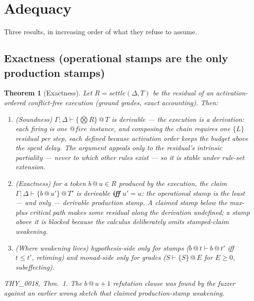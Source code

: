 \documentclass[11pt]{article}
\makeatletter
\newcommand{\lax}[2]{\{#1\}\mathbin{@}#2}       %
\newcommand{\stmp}[2]{#1\mathbin{@}#2}           %
\newcommand{\settle}{\mathit{settle}}
\newtheorem{theorem}{Theorem}[section]
\theoremstyle{definition}
\theoremstyle{remark}
\makeatother
\begin{document}
\section{Adequacy}
\label{sec:adequacy}

Three results, in increasing order of what they refuse to assume.

\subsection{Exactness (operational stamps are the only production stamps)}
\label{subsec:exact}

\begin{theorem}[Exactness]
\label{thm:exact}
Let $R = \settle(\Delta, T)$ be the residual of an activation-ordered
conflict-free execution (ground grades, exact accounting).  Then:
\begin{enumerate}
\item \emph{(Soundness)} $\Gamma; \Delta \vdash \lax{\bigotimes R}{T}$ is
  derivable --- the execution \emph{is} a derivation: each firing is one
  $\mathit{@fire}$ instance, and composing the chain requires one
  $\mathit{\{L\}}$ residual per step, each \emph{defined} because activation
  order keeps the budget above the spent delay.  The argument appeals only to
  the residual's intrinsic partiality --- never to which other rules exist ---
  so it is stable under rule-set extension.
\item \emph{(Exactness)} for a token $\stmp{b}{u} \in R$ produced by the
  execution, the claim $\Gamma; \Delta \vdash \lax{\stmp{b}{u'}}{T'}$ is derivable
  \textbf{iff} $u' = u$: the operational stamp is the least --- and \emph{only}
  --- derivable production stamp.  A claimed stamp below the max-plus critical
  path makes some residual along the derivation undefined; a stamp above it is
  blocked because the calculus deliberately omits stamped-claim weakening.
\item \emph{(Where weakening lives)} hypothesis-side only for stamps
  ($\stmp{b}{t} \vdash \stmp{b}{t'}$ iff $t \leq t'$, retiming) and monad-side
  only for grades ($S \vdash \lax{S}{E}$ for $E \geq 0$, subeffecting).
\end{enumerate}
THY\_0018, Thm.~1.  The $\stmp{b}{u+1}$ refutation clause was found by the fuzzer
against an earlier wrong sketch that claimed production-stamp weakening.
\end{theorem}
\end{document}
